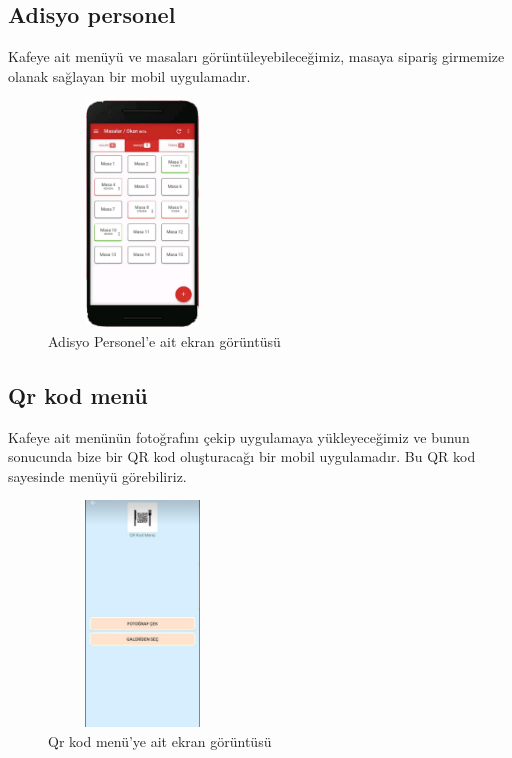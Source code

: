 \subsection{Adisyo personel}

Kafeye ait menüyü ve masaları görüntüleyebileceğimiz, masaya sipariş girmemize olanak sağlayan bir mobil uygulamadır.

\begin{figure}[h!]
 \centering
 \includegraphics[width=5cm,height=6cm,keepaspectratio=true]{./fig/Adisyo-Masalar}
  \caption{Adisyo Personel'e ait ekran görüntüsü}
   \label{fig:ch2-1-1}
\end{figure}


\subsection{Qr kod menü}

Kafeye ait menünün fotoğrafını çekip uygulamaya yükleyeceğimiz ve bunun sonucunda bize bir QR kod oluşturacağı bir mobil uygulamadır. Bu QR kod sayesinde menüyü görebiliriz.
\begin{figure} [h]
 \centering
 \includegraphics[width=5cm,height=6cm,keepaspectratio=true]{./fig/Qrkod-Menu}
  \caption{Qr kod menü'ye ait ekran görüntüsü}
 \label{fig:ch2-1-2}
\end{figure}

